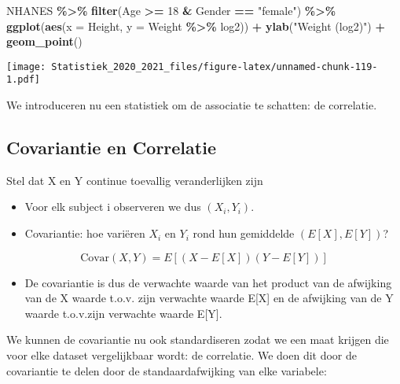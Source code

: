 \documentclass[
  12pt,dutch,coursenotes]{book}
\newenvironment{Shaded}{\begin{snugshade}}{\end{snugshade}}
\newcommand{\DataTypeTok}[1]{\textcolor[rgb]{0.13,0.29,0.53}{#1}}
\newcommand{\DecValTok}[1]{\textcolor[rgb]{0.00,0.00,0.81}{#1}}
\newcommand{\KeywordTok}[1]{\textcolor[rgb]{0.13,0.29,0.53}{\textbf{#1}}}
\newcommand{\NormalTok}[1]{#1}
\newcommand{\OperatorTok}[1]{\textcolor[rgb]{0.81,0.36,0.00}{\textbf{#1}}}
\newcommand{\StringTok}[1]{\textcolor[rgb]{0.31,0.60,0.02}{#1}}
\providecommand{\tightlist}{%
  \setlength{\itemsep}{0pt}\setlength{\parskip}{0pt}}
\theoremstyle{definition}
\theoremstyle{definition}
\theoremstyle{definition}
\theoremstyle{remark}
\begin{document}
\begin{Shaded}
\begin{Highlighting}[]
\NormalTok{NHANES }\OperatorTok{\%\textgreater{}\%}\StringTok{ }\KeywordTok{filter}\NormalTok{(Age }\OperatorTok{\textgreater{}=}\StringTok{ }\DecValTok{18} \OperatorTok{\&}\StringTok{ }\NormalTok{Gender }\OperatorTok{==}\StringTok{ "female"}\NormalTok{) }\OperatorTok{\%\textgreater{}\%}\StringTok{ }
\StringTok{    }\KeywordTok{ggplot}\NormalTok{(}\KeywordTok{aes}\NormalTok{(}\DataTypeTok{x =}\NormalTok{ Height, }\DataTypeTok{y =}\NormalTok{ Weight }\OperatorTok{\%\textgreater{}\%}\StringTok{ }\NormalTok{log2)) }\OperatorTok{+}\StringTok{ }
\StringTok{    }\KeywordTok{ylab}\NormalTok{(}\StringTok{"Weight (log2)"}\NormalTok{) }\OperatorTok{+}\StringTok{ }\KeywordTok{geom\_point}\NormalTok{()}
\end{Highlighting}
\end{Shaded}

\texttt{[image: Statistiek\_2020\_2021\_files/figure-latex/unnamed-chunk-119-1.pdf]}

We introduceren nu een statistiek om de associatie te schatten: de correlatie.

\hypertarget{covariantie-en-correlatie}{%
\subsection{Covariantie en Correlatie}\label{covariantie-en-correlatie}}

Stel dat X en Y continue toevallig veranderlijken zijn

\begin{itemize}
\tightlist
\item
  Voor elk subject i observeren we dus \((X_i,Y_i)\).
\item
  Covariantie: hoe variëren \(X_i\) en \(Y_i\) rond hun gemiddelde \((E[X],E[Y])\)?
\end{itemize}

\[\mbox{Covar}(X,Y)=E[(X-E[X])(Y-E[Y])]\]

\begin{itemize}
\tightlist
\item
  De covariantie is dus de verwachte waarde van het product van de afwijking van de X waarde t.o.v. zijn verwachte waarde E{[}X{]} en de afwijking van de Y waarde t.o.v.zijn verwachte waarde E{[}Y{]}.
\end{itemize}

We kunnen de covariantie nu ook standardiseren zodat we een maat krijgen die voor elke dataset vergelijkbaar wordt: de correlatie. We doen dit door de covariantie te delen door de standaardafwijking van elke variabele:
\end{document}
